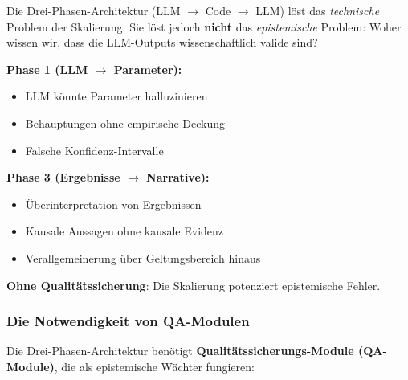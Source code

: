 Die Drei-Phasen-Architektur (LLM $\rightarrow$ Code $\rightarrow$ LLM) löst das \textit{technische} Problem der Skalierung. Sie löst jedoch \textbf{nicht} das \textit{epistemische} Problem: Woher wissen wir, dass die LLM-Outputs wissenschaftlich valide sind?

\begin{tcolorbox}[colback=red!5!white, colframe=red!75!black, title=Das epistemische Risiko der Drei-Phasen-Architektur]
\textbf{Phase 1 (LLM $\rightarrow$ Parameter):}
\begin{itemize}
    \item LLM könnte Parameter halluzinieren
    \item Behauptungen ohne empirische Deckung
    \item Falsche Konfidenz-Intervalle
\end{itemize}

\textbf{Phase 3 (Ergebnisse $\rightarrow$ Narrative):}
\begin{itemize}
    \item Überinterpretation von Ergebnissen
    \item Kausale Aussagen ohne kausale Evidenz
    \item Verallgemeinerung über Geltungsbereich hinaus
\end{itemize}

\textbf{Ohne Qualitätssicherung}: Die Skalierung potenziert epistemische Fehler.
\end{tcolorbox}

\subsubsection{Die Notwendigkeit von QA-Modulen}

Die Drei-Phasen-Architektur benötigt \textbf{Qualitätssicherungs-Module (QA-Module)}, die als epistemische Wächter fungieren:

